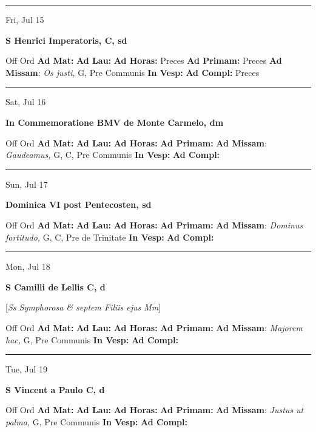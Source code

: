 \documentclass[letterpaper, 10pt]{article}
\begin{document}
\hrule
\begin{center}
Fri, Jul 15
\end{center}\textbf{ \large S Henrici Imperatoris, C, \textnormal{\normalsize sd}}
\begin{justify}
Off Ord
\textbf{Ad Mat: }
\textbf{Ad Lau: }
\textbf{Ad Horas: }Preces
\textbf{Ad Primam: }Preces
\textbf{Ad Missam}: \textit{Os justi,} G, Pre Communis
\textbf{In Vesp: }
\textbf{Ad Compl: }Preces\end{justify}



\hrule
\begin{center}
Sat, Jul 16
\end{center}\textbf{ \large In Commemoratione BMV de Monte Carmelo, \textnormal{\normalsize dm}}
\begin{justify}
Off Ord
\textbf{Ad Mat: }
\textbf{Ad Lau: }
\textbf{Ad Horas: }
\textbf{Ad Primam: }
\textbf{Ad Missam}: \textit{Gaudeamus,} G, C, Pre Communis
\textbf{In Vesp: }
\textbf{Ad Compl: }\end{justify}



\hrule
\begin{center}
Sun, Jul 17
\end{center}\textbf{ \large Dominica VI post Pentecosten, \textnormal{\normalsize sd}}
\begin{justify}
Off Ord
\textbf{Ad Mat: }
\textbf{Ad Lau: }
\textbf{Ad Horas: }
\textbf{Ad Primam: }
\textbf{Ad Missam}: \textit{Dominus fortitudo,} G, C, Pre de Trinitate
\textbf{In Vesp: }
\textbf{Ad Compl: }\end{justify}



\hrule
\begin{center}
Mon, Jul 18
\end{center}\textbf{ \large S Camilli de Lellis C, \textnormal{\normalsize d}}

[\textit{Ss Symphorosa \& septem Filiis ejus Mm}]
\begin{justify}
Off Ord
\textbf{Ad Mat: }
\textbf{Ad Lau: }
\textbf{Ad Horas: }
\textbf{Ad Primam: }
\textbf{Ad Missam}: \textit{Majorem hac,} G, Pre Communis
\textbf{In Vesp: }
\textbf{Ad Compl: }\end{justify}



\hrule
\begin{center}
Tue, Jul 19
\end{center}\textbf{ \large S Vincent a Paulo C, \textnormal{\normalsize d}}
\begin{justify}
Off Ord
\textbf{Ad Mat: }
\textbf{Ad Lau: }
\textbf{Ad Horas: }
\textbf{Ad Primam: }
\textbf{Ad Missam}: \textit{Justus ut palma,} G, Pre Communis
\textbf{In Vesp: }
\textbf{Ad Compl: }\end{justify}
\end{document}
